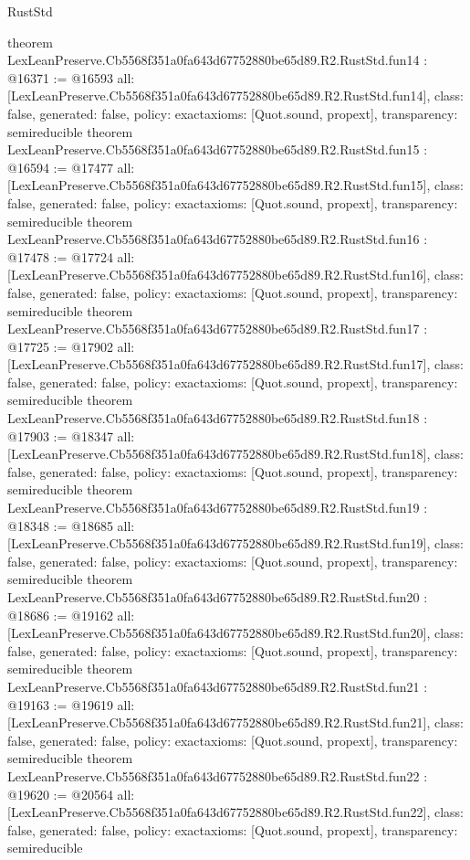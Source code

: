 \begin{lexlean}{RustStd}
\begin{coremodule}
{}
theorem LexLeanPreserve.Cb5568f351a0fa643d67752880be65d89.R2.RustStd.fun14 : @16371 := @16593 {
  all: [LexLeanPreserve.Cb5568f351a0fa643d67752880be65d89.R2.RustStd.fun14],
  class: false,
  generated: false,
  policy: exact{axioms: [Quot.sound, propext]},
  transparency: semireducible
}
theorem LexLeanPreserve.Cb5568f351a0fa643d67752880be65d89.R2.RustStd.fun15 : @16594 := @17477 {
  all: [LexLeanPreserve.Cb5568f351a0fa643d67752880be65d89.R2.RustStd.fun15],
  class: false,
  generated: false,
  policy: exact{axioms: [Quot.sound, propext]},
  transparency: semireducible
}
theorem LexLeanPreserve.Cb5568f351a0fa643d67752880be65d89.R2.RustStd.fun16 : @17478 := @17724 {
  all: [LexLeanPreserve.Cb5568f351a0fa643d67752880be65d89.R2.RustStd.fun16],
  class: false,
  generated: false,
  policy: exact{axioms: [Quot.sound, propext]},
  transparency: semireducible
}
theorem LexLeanPreserve.Cb5568f351a0fa643d67752880be65d89.R2.RustStd.fun17 : @17725 := @17902 {
  all: [LexLeanPreserve.Cb5568f351a0fa643d67752880be65d89.R2.RustStd.fun17],
  class: false,
  generated: false,
  policy: exact{axioms: [Quot.sound, propext]},
  transparency: semireducible
}
theorem LexLeanPreserve.Cb5568f351a0fa643d67752880be65d89.R2.RustStd.fun18 : @17903 := @18347 {
  all: [LexLeanPreserve.Cb5568f351a0fa643d67752880be65d89.R2.RustStd.fun18],
  class: false,
  generated: false,
  policy: exact{axioms: [Quot.sound, propext]},
  transparency: semireducible
}
theorem LexLeanPreserve.Cb5568f351a0fa643d67752880be65d89.R2.RustStd.fun19 : @18348 := @18685 {
  all: [LexLeanPreserve.Cb5568f351a0fa643d67752880be65d89.R2.RustStd.fun19],
  class: false,
  generated: false,
  policy: exact{axioms: [Quot.sound, propext]},
  transparency: semireducible
}
theorem LexLeanPreserve.Cb5568f351a0fa643d67752880be65d89.R2.RustStd.fun20 : @18686 := @19162 {
  all: [LexLeanPreserve.Cb5568f351a0fa643d67752880be65d89.R2.RustStd.fun20],
  class: false,
  generated: false,
  policy: exact{axioms: [Quot.sound, propext]},
  transparency: semireducible
}
theorem LexLeanPreserve.Cb5568f351a0fa643d67752880be65d89.R2.RustStd.fun21 : @19163 := @19619 {
  all: [LexLeanPreserve.Cb5568f351a0fa643d67752880be65d89.R2.RustStd.fun21],
  class: false,
  generated: false,
  policy: exact{axioms: [Quot.sound, propext]},
  transparency: semireducible
}
theorem LexLeanPreserve.Cb5568f351a0fa643d67752880be65d89.R2.RustStd.fun22 : @19620 := @20564 {
  all: [LexLeanPreserve.Cb5568f351a0fa643d67752880be65d89.R2.RustStd.fun22],
  class: false,
  generated: false,
  policy: exact{axioms: [Quot.sound, propext]},
  transparency: semireducible
}
\end{coremodule}
\end{lexlean}
